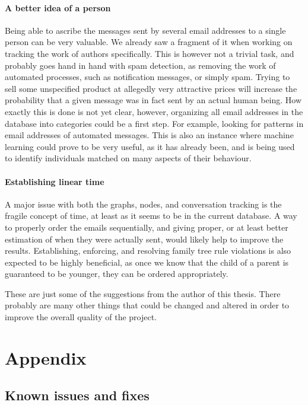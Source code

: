 \documentclass[a4paper,english]{report}
\begin{document}
\subsubsection{A better idea of a person}
Being able to ascribe the messages sent by several email addresses to a single person can be very valuable. We already saw a fragment of it when working on tracking the work of authors specifically. This is however not a trivial task, and probably goes hand in hand with spam detection, as removing the work of automated processes, such as notification messages, or simply spam. Trying to sell some unspecified product at allegedly very attractive prices will increase the probability that a given message was in fact sent by an actual human being.
How exactly this is done is not yet clear, however, organizing all email addresses in the database into categories could be a first step.  For example, looking for patterns in email addresses of automated messages.
This is also an instance where machine learning could prove to be very useful, as it has already been, and is being used to identify individuals matched on many aspects of their behaviour.
 

\subsubsection{Establishing linear time}
A major issue with both the graphs, nodes, and conversation tracking is the fragile concept of time, at least as it seems to be in the current database. A way to properly order the emails sequentially, and giving proper, or at least better estimation of when they were actually sent, would likely help to improve the results. Establishing, enforcing, and resolving family tree rule violations is also expected to be highly beneficial, as once we know that the child of a parent is guaranteed to be younger, they can be ordered appropriately.

These are just some of the suggestions from the author of this thesis. There probably are many other things that could be changed and altered in order to improve the overall quality of the project.







\chapter{Appendix}

\section{Known issues and fixes}
\end{document}
